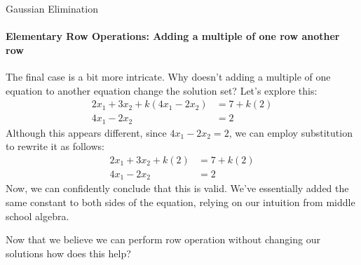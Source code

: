 \documentclass{beamer}
\begin{document}
\begin{frame}{Gaussian Elimination}
\framesubtitle{Elementary Row Operations: Adding a multiple of one row another row}
The final case is a bit more intricate. Why doesn't adding a multiple of one equation to another equation change the solution set? Let's explore this:
\begin{align*}
    2x_1 + 3x_2 + k(4x_1 - 2x_2) &= 7 + k(2) \\
    4x_1 - 2x_2 &= 2
\end{align*}
Although this appears different, since $4x_1 - 2x_2 = 2$, we can employ substitution to rewrite it as follows:
\begin{align*}
    2x_1 + 3x_2 + k(2) &= 7 + k(2) \\
    4x_1 - 2x_2 &= 2
\end{align*}
Now, we can confidently conclude that this is valid. We've essentially added the same constant to both sides of the equation, relying on our intuition from middle school algebra.

Now that we believe we can perform row operation without changing our solutions how does this help?
\end{frame}
\end{document}
